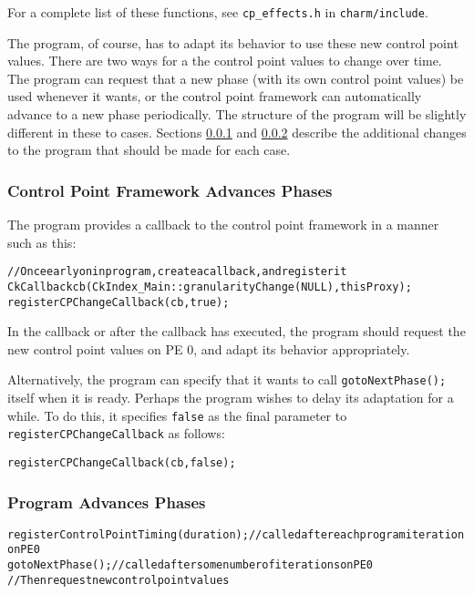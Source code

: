 For a complete list of these functions, see \texttt{cp\_effects.h} in \texttt{charm/include}.


The program, of course, has to adapt its behavior to use these new control point values. There are two ways for a the control point values to change over time. The program can request that a new phase (with its own control point values) be used whenever it wants, or the control point framework can automatically advance to a new phase periodically. The structure of the program will be slightly different in these to cases. Sections \ref{frameworkAdvancesPhases} and \ref{programAdvancesPhases} describe the additional changes to the program that should be made for each case.

\subsubsection{Control Point Framework Advances Phases}
\label{frameworkAdvancesPhases}

The program provides a callback to the control point framework in a manner such as this:

\begin{alltt} 
    // Once early on in program, create a callback, and register it 
    CkCallback cb(CkIndex_Main::granularityChange(NULL),thisProxy); 
    registerCPChangeCallback(cb, true);
\end{alltt} 

In the callback or after the callback has executed, the program should request the new control point values on PE 0, and adapt its behavior appropriately.

Alternatively, the program can specify that it wants to call \texttt{gotoNextPhase();} itself when it is ready. Perhaps the program wishes to delay its adaptation for a while. To do this, it specifies \texttt{false} as the final parameter to \texttt{registerCPChangeCallback} as follows:

\begin{alltt} 
   registerCPChangeCallback(cb, false);
\end{alltt} 


\subsubsection{Program Advances Phases}
\label{programAdvancesPhases}

\begin{alltt} 
     registerControlPointTiming(duration); // called after each program iteration on PE 0
     gotoNextPhase(); // called after some number of iterations on PE 0
    // Then request new control point values
\end{alltt} 



